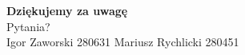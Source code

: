 \documentclass{beamer}
\begin{document}
\begin{frame}{}
    \begin{center}
        \vspace{1.5em}
        {\Huge \textbf{Dzi\k{e}kujemy za uwag\k{e}}}\\[1.2em]
        {\Large Pytania?}\\[1.8em]
        \footnotesize
        Igor Zaworski 280631 Mariusz Rychlicki 280451
    \end{center}
\end{frame}
\end{document}
